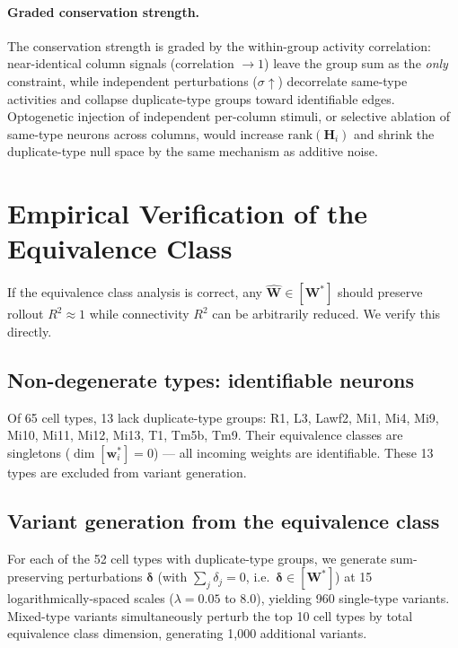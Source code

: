 \documentclass[11pt,a4paper]{article}
\begin{document}
\paragraph{Graded conservation strength.}
The conservation strength is graded by the within-group activity correlation:
near-identical column signals (correlation $\to 1$) leave the group sum as the
\emph{only} constraint, while independent perturbations ($\sigma \uparrow$)
decorrelate same-type activities and collapse duplicate-type groups toward
identifiable edges.  Optogenetic injection of independent per-column stimuli,
or selective ablation of same-type neurons across columns, would increase
$\mathrm{rank}(\mathbf{H}_i)$ and shrink the duplicate-type null space by the
same mechanism as additive noise.

\section{Empirical Verification of the Equivalence Class}

If the equivalence class analysis is correct, any $\hat{\mathbf{W}} \in
[\mathbf{W}^*]$ should preserve rollout $R^2 \approx 1$ while connectivity $R^2$
can be arbitrarily reduced. We verify this directly.

\subsection{Non-degenerate types: identifiable neurons}

Of 65 cell types, 13 lack duplicate-type groups: R1, L3, Lawf2, Mi1, Mi4, Mi9,
Mi10, Mi11, Mi12, Mi13, T1, Tm5b, Tm9. Their equivalence classes are singletons
($\dim[\mathbf{w}_i^*] = 0$) --- all incoming weights are identifiable. These 13
types are excluded from variant generation.

\subsection{Variant generation from the equivalence class}

For each of the 52 cell types with duplicate-type groups, we generate sum-preserving
perturbations $\boldsymbol{\delta}$ (with $\sum_j\delta_j = 0$, i.e.\
$\boldsymbol{\delta} \in [\mathbf{W}^*]$) at 15 logarithmically-spaced scales
($\lambda = 0.05$ to $8.0$), yielding 960 single-type variants. Mixed-type variants
simultaneously perturb the top 10 cell types by total equivalence class dimension,
generating 1{,}000 additional variants.
\end{document}
